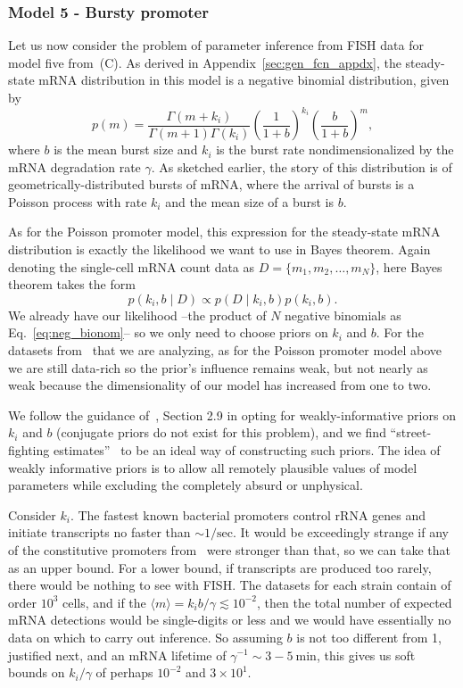 \subsubsection{Model 5 - Bursty promoter}
Let us now consider the problem of parameter inference from FISH data for model
five from~(C). As derived in
Appendix~\ref{sec:gen_fcn_appdx}, the steady-state mRNA distribution in this
model is a negative binomial distribution, given by
\begin{equation}
p(m) = \frac{\Gamma(m+k_i)}{\Gamma(m+1)\Gamma(k_i)}
        \left(\frac{1}{1+b}\right)^{k_i}
        \left(\frac{b}{1+b}\right)^m,
\label{eq:neg_bionom}
\end{equation}
where $b$ is the mean burst size and $k_i$ is the burst rate nondimensionalized
by the mRNA degradation rate $\gamma$. As sketched earlier, the story of this
distribution is of geometrically-distributed bursts of mRNA, where the arrival
of bursts is a Poisson process with rate $k_i$ and the mean size of a burst is
$b$.

As for the Poisson promoter model, this expression for the steady-state mRNA
distribution is exactly the likelihood we want to use in Bayes theorem. Again
denoting the single-cell mRNA count data as $D=\{m_1, m_2,\dots, m_N\}$, here
Bayes theorem takes the form
\begin{equation}
p(k_i, b \mid D) \propto p(D\mid k_i,b)p(k_i, b).
\end{equation}
We already have our likelihood --the product of $N$ negative binomials as
Eq.~\ref{eq:neg_bionom}--  so we only need to choose priors on $k_i$ and $b$.
For the datasets from~\cite{Jones2014} that we are analyzing, as for the Poisson
promoter model above we are still data-rich so the prior's influence remains
weak, but not nearly as weak because the dimensionality of our model has
increased from one to two.

We follow the guidance of~\cite{Gelman2013}, Section 2.9 in
opting for weakly-informative priors on $k_i$ and $b$ (conjugate
priors do not exist for this problem), and we find
``street-fighting estimates''~\cite{Mahajan2010} to be an ideal
way of constructing such priors. The idea of weakly informative
priors is to allow all remotely plausible values of model
parameters while excluding the completely absurd or unphysical.

Consider $k_i$. The fastest known bacterial promoters control
rRNA genes and initiate transcripts no faster than $\sim
1/\text{sec}$. It would be exceedingly strange if any of the
constitutive promoters from~\cite{Jones2014} were stronger than
that, so we can take that as an upper bound. For a lower bound,
if transcripts are produced too rarely, there would be nothing to
see with FISH. The datasets for each strain contain of order
$10^3$ cells, and if the $\langle m \rangle = k_i b/\gamma
\lesssim 10^{-2}$, then the total number of expected mRNA
detections would be single-digits or less and we would have
essentially no data on which to carry out inference. So assuming
$b$ is not too different from 1, justified next, and an mRNA
lifetime of $\gamma^{-1}\sim 3-5~\text{min}$, this gives us soft
bounds on $k_i/\gamma$ of perhaps $10^{-2}$ and $3\times 10^1$.

